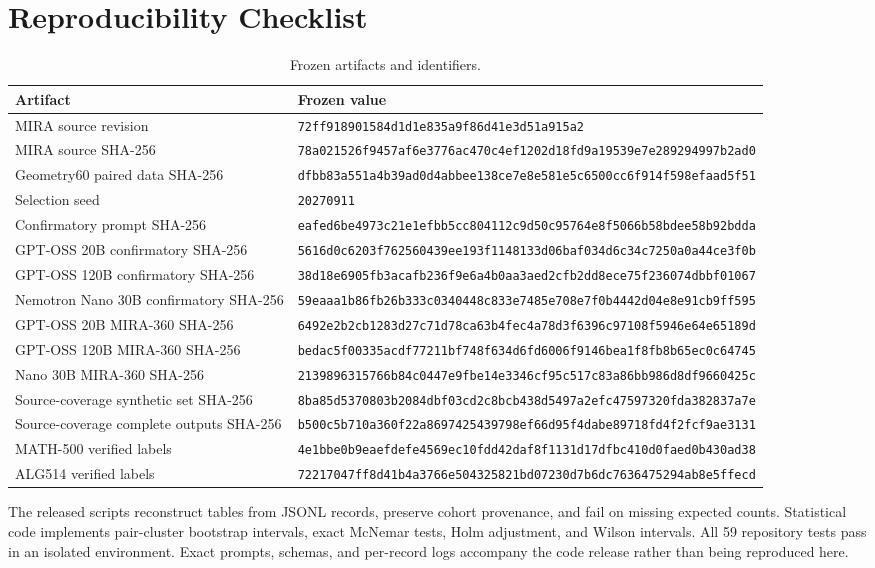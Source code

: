 \documentclass[10pt]{article}
\newcommand{\code}[1]{{\footnotesize\nolinkurl{#1}}}
\begin{document}
\section{Reproducibility Checklist}
\begin{table}[h]
\centering
\caption{Frozen artifacts and identifiers.}
\begin{tabularx}{0.96\textwidth}{@{}lY@{}}
\toprule
Artifact & Frozen value\\
\midrule
MIRA source revision & \code{72ff918901584d1d1e835a9f86d41e3d51a915a2}\\
MIRA source SHA-256 & \code{78a021526f9457af6e3776ac470c4ef1202d18fd9a19539e7e289294997b2ad0}\\
Geometry60 paired data SHA-256 & \code{dfbb83a551a4b39ad0d4abbee138ce7e8e581e5c6500cc6f914f598efaad5f51}\\
Selection seed & \code{20270911}\\
Confirmatory prompt SHA-256 & \code{eafed6be4973c21e1efbb5cc804112c9d50c95764e8f5066b58bdee58b92bdda}\\
GPT-OSS 20B confirmatory SHA-256 & \code{5616d0c6203f762560439ee193f1148133d06baf034d6c34c7250a0a44ce3f0b}\\
GPT-OSS 120B confirmatory SHA-256 & \code{38d18e6905fb3acafb236f9e6a4b0aa3aed2cfb2dd8ece75f236074dbbf01067}\\
Nemotron Nano 30B confirmatory SHA-256 & \code{59eaaa1b86fb26b333c0340448c833e7485e708e7f0b4442d04e8e91cb9ff595}\\
GPT-OSS 20B MIRA-360 SHA-256 & \code{6492e2b2cb1283d27c71d78ca63b4fec4a78d3f6396c97108f5946e64e65189d}\\
GPT-OSS 120B MIRA-360 SHA-256 & \code{bedac5f00335acdf77211bf748f634d6fd6006f9146bea1f8fb8b65ec0c64745}\\
Nano 30B MIRA-360 SHA-256 & \code{2139896315766b84c0447e9fbe14e3346cf95c517c83a86bb986d8df9660425c}\\
Source-coverage synthetic set SHA-256 & \code{8ba85d5370803b2084dbf03cd2c8bcb438d5497a2efc47597320fda382837a7e}\\
Source-coverage complete outputs SHA-256 & \code{b500c5b710a360f22a8697425439798ef66d95f4dabe89718fd4f2fcf9ae3131}\\
MATH-500 verified labels & \code{4e1bbe0b9eaefdefe4569ec10fdd42daf8f1131d17dfbc410d0faed0b430ad38}\\
ALG514 verified labels & \code{72217047ff8d41b4a3766e504325821bd07230d7b6dc7636475294ab8e5ffecd}\\
\bottomrule
\end{tabularx}
\end{table}
The released scripts reconstruct tables from JSONL records, preserve cohort provenance, and fail on missing expected counts. Statistical code implements pair-cluster bootstrap intervals, exact McNemar tests, Holm adjustment, and Wilson intervals. All 59 repository tests pass in an isolated environment. Exact prompts, schemas, and per-record logs accompany the code release rather than being reproduced here.
\end{document}
